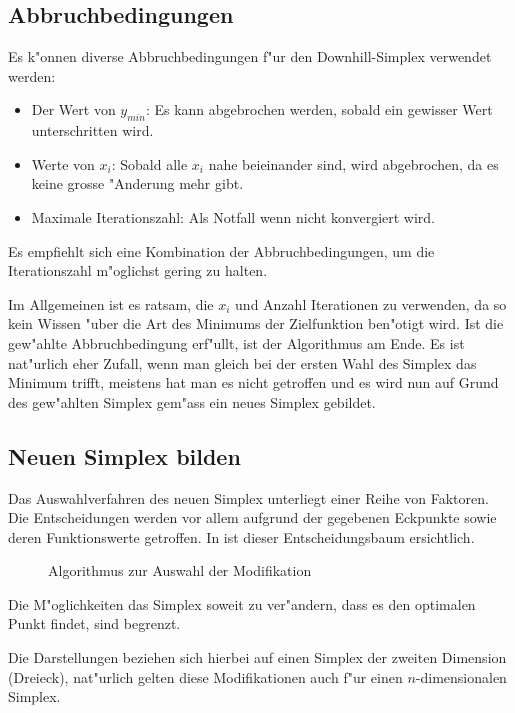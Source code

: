 \subsection{Abbruchbedingungen}
\label{sec:downhillAbbruch}
Es k"onnen diverse Abbruchbedingungen f"ur den Downhill-Simplex verwendet werden:
\begin{itemize}
\item Der Wert von $y_{min}$: Es kann abgebrochen werden, sobald ein gewisser Wert unterschritten wird.
\item Werte von $x_i$: Sobald alle $x_i$ nahe beieinander sind, wird abgebrochen, da es keine grosse "Anderung mehr gibt.
\item Maximale Iterationszahl: Als Notfall wenn nicht konvergiert wird.
\end{itemize}

Es empfiehlt sich eine Kombination der Abbruchbedingungen, um die
Iterationszahl m"og\-lichst gering zu halten.


Im Allgemeinen ist es ratsam, die $x_i$ und Anzahl Iterationen zu
verwenden, da so kein Wissen "uber die Art des Minimums der Zielfunktion
ben"otigt wird.
Ist die gew"ahlte Abbruchbedingung erf"ullt, ist der Algorithmus am Ende.
Es ist nat"urlich eher Zufall, wenn man gleich bei der ersten
Wahl des Simplex das Minimum trifft, meistens hat man es nicht
getroffen und es wird nun auf Grund des gew"ahlten Simplex gem"ass
 ein neues Simplex gebildet.

\subsection{Neuen Simplex bilden}
\label{sec:downhillModi}

Das Auswahlverfahren des neuen Simplex unterliegt einer Reihe von
Faktoren. Die Entscheidungen werden vor allem aufgrund der gegebenen
Eckpunkte sowie deren Funktionswerte getroffen.
In  ist dieser Entscheidungsbaum ersichtlich.

\begin{figure}[h]

\caption{Algorithmus zur Auswahl der Modifikation}
\label{fig:downhillalg2}
\end{figure}

Die M"oglichkeiten das Simplex soweit zu ver"andern, dass es den optimalen
Punkt findet, sind begrenzt.

Die Darstellungen beziehen sich hierbei auf einen Simplex der zweiten
Dimension (Dreieck), nat"urlich gelten diese Modifikationen auch f"ur
einen $n$-dimensionalen Simplex.

